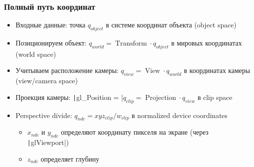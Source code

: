 \documentclass[10pt]{beamer}
\begin{document}
\begin{frame}[fragile]
\frametitle{Полный путь координат}
\begin{itemize}
\item Входные данные: точка \begin{math}q_{object}\end{math} в системе координат объекта (object space)
\pause
\item Позиционируем объект: \begin{math}q_{world} = \operatorname{Transform} \cdot q_{object}\end{math} в мировых координатах (world space)
\pause
\item Учитываем расположение камеры: \begin{math}q_{view} = \operatorname{View} \cdot q_{world}\end{math} в координатах камеры (view/camera space)
\pause
\item Проекция камеры: \texttt|gl_Position = |\begin{math}q_{clip} = \operatorname{Projection} \cdot q_{view}\end{math} в clip space
\pause
\item Perspective divide: \begin{math}q_{ndc} = xyz_{clip} / w_{clip}\end{math} в normalized device coordinates
\pause
\begin{itemize}
\item \begin{math}x_{ndc}\end{math} и \begin{math}y_{ndc}\end{math} определяют координату пикселя на экране (через \texttt|glViewport|)
\item \begin{math}z_{ndc}\end{math} определяет глубину
\end{itemize}
\end{itemize}
\end{frame}
\end{document}
